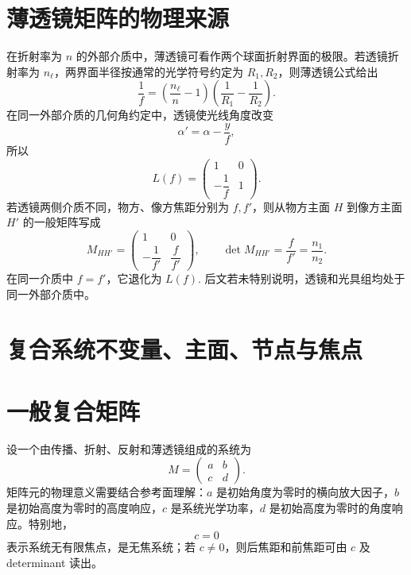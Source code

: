 \section{薄透镜矩阵的物理来源}

在折射率为 \(n\) 的外部介质中，薄透镜可看作两个球面折射界面的极限。若透镜折射率为 \(n_\ell\)，两界面半径按通常的光学符号约定为 \(R_1,R_2\)，则薄透镜公式给出
\begin{equation}
	\frac{1}{f}
	=\left(\frac{n_\ell}{n}-1\right)
	\left(\frac{1}{R_1}-\frac{1}{R_2}\right).
\end{equation}
在同一外部介质的几何角约定中，透镜使光线角度改变
\begin{equation}
	\alpha'=\alpha-\frac{y}{f},
\end{equation}
所以
\begin{equation}
	L(f)=
	\begin{pmatrix}
		1&0\\[2pt]-\dfrac{1}{f}&1
	\end{pmatrix}.
\end{equation}
若透镜两侧介质不同，物方、像方焦距分别为 \(f,f'\)，则从物方主面 \(H\) 到像方主面 \(H'\) 的一般矩阵写成
\begin{equation}
	M_{HH'}=
	\begin{pmatrix}
		1&0\\[2pt]
		-\dfrac{1}{f'}&\dfrac{f}{f'}
	\end{pmatrix},
\qquad
\det M_{HH'}=\frac{f}{f'}=\frac{n_1}{n_2}.
\end{equation}
在同一介质中 \(f=f'\)，它退化为 \(L(f)\). 后文若未特别说明，透镜和光具组均处于同一外部介质中。

\section{复合系统不变量、主面、节点与焦点}

\section{一般复合矩阵}

设一个由传播、折射、反射和薄透镜组成的系统为
\begin{equation}
	M=
	\begin{pmatrix}
		a&b\\c&d
	\end{pmatrix}.
\end{equation}
矩阵元的物理意义需要结合参考面理解：\(a\) 是初始角度为零时的横向放大因子，\(b\) 是初始高度为零时的高度响应，\(c\) 是系统光学功率，\(d\) 是初始高度为零时的角度响应。特别地，
\begin{equation}
	c=0
\end{equation}
表示系统无有限焦点，是无焦系统；若 \(c\neq0\)，则后焦距和前焦距可由 \(c\) 及 determinant 读出。

